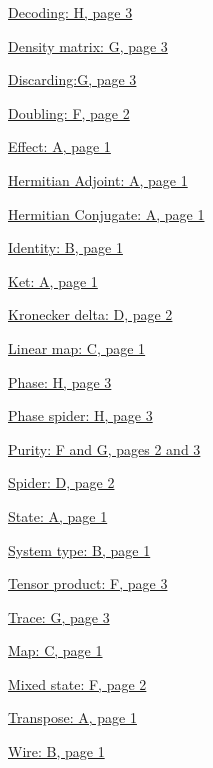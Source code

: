 \documentclass[]{article}
\begin{document}
\hyperref[phasespiders]{Decoding: H, page 3}

\hyperref[discarding]{Density matrix: G, page 3}

\hyperref[discarding]{Discarding:G, page 3}

\hyperref[doubling]{Doubling: F, page 2}

\hyperref[braandket]{Effect: A, page 1}

\hyperref[braandket]{Hermitian Adjoint: A, page 1}

\hyperref[braandket]{Hermitian Conjugate: A, page 1}

\hyperref[identity]{Identity: B, page 1}

\hyperref[braandket]{Ket: A, page 1}

\hyperref[spiders]{Kronecker delta: D, page 2}

\hyperref[maps]{Linear map: C, page 1}

\hyperref[phasespiders]{Phase: H, page 3}

\hyperref[phasespiders]{Phase spider: H, page 3}

\hyperref[doubling]{Purity: F and G, pages 2 and 3}

\hyperref[spiders]{Spider: D, page 2}

\hyperref[braandket]{State: A, page 1}

\hyperref[identity]{System type: B, page 1}

\hyperref[doubling]{Tensor product: F, page 3}

\hyperref[discarding]{Trace: G, page 3}

\hyperref[maps]{Map: C, page 1}

\hyperref[doubling]{Mixed state: F, page 2}

\hyperref[braandket]{Transpose: A, page 1}

\hyperref[identity]{Wire: B, page 1}
\end{document}
